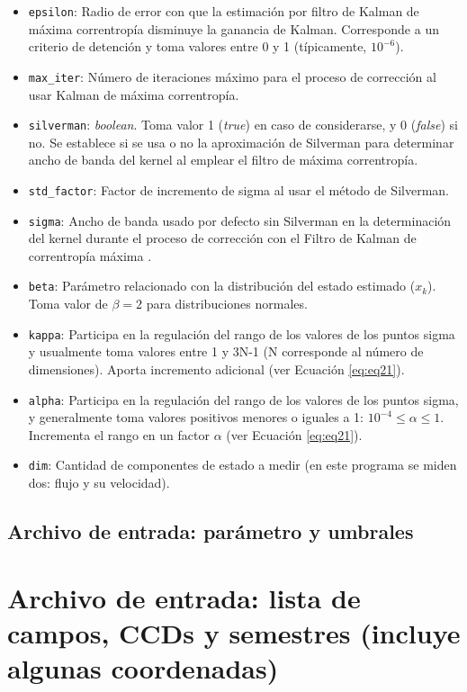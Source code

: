 \begin{appendix}
\begin{itemize}
\item \texttt{epsilon}: Radio de error con que la estimaci\'on por filtro de Kalman de m\'axima correntrop\'ia disminuye la ganancia de Kalman. Corresponde a un criterio de detenci\'on y toma valores entre 0 y 1 (t\'ipicamente, $10^{-6}$)\cite{badong}.
\item \texttt{max\_iter}: N\'umero de iteraciones m\'aximo para el proceso de correcci\'on al usar Kalman de m\'axima correntrop\'ia. 
\item \texttt{silverman}: \textit{boolean}. Toma valor 1 (\textit{true}) en caso de considerarse, y 0 (\textit{false}) si no. Se establece si se usa o no la aproximaci\'on de Silverman para determinar ancho de banda del kernel al emplear el filtro de m\'axima correntrop\'ia.
\item \texttt{std\_factor}: Factor de incremento de sigma al usar el m\'etodo de Silverman.
\item \texttt{sigma}: Ancho de banda usado por defecto sin Silverman en la determinaci\'on del kernel durante el proceso de correcci\'on con el Filtro de Kalman de correntrop\'ia m\'axima .
\item \texttt{beta}: Par\'ametro relacionado con la distribuci\'on del estado estimado ($x_k$). Toma valor de $\beta = 2$ para distribuciones normales.
\item \texttt{kappa}: Participa en la regulaci\'on del rango de los valores de los puntos sigma y usualmente toma valores entre 1 y 3N-1 (N corresponde al n\'umero de dimensiones)\cite{wan}. Aporta incremento adicional (ver Ecuaci\'on \ref{eq:eq21}).
\item \texttt{alpha}: Participa en la regulaci\'on del rango de los valores de los puntos sigma, y generalmente toma valores positivos menores o iguales a 1: $10^{-4} \leq \alpha \leq 1 $\cite{wan}. Incrementa el rango en un factor $\alpha$ (ver Ecuaci\'on \ref{eq:eq21}).
\item \texttt{dim}: Cantidad de componentes de estado a medir (en este programa se miden dos: flujo y su velocidad).
\end{itemize}
\subsection{Archivo de entrada: par\'ametro y umbrales}
\label{subs:settings_file}
\pagebreak


\section{Archivo de entrada: lista de campos, CCDs y semestres (incluye algunas coordenadas)}
\label{subs:sn_list}
\pagebreak


\end{appendix}
